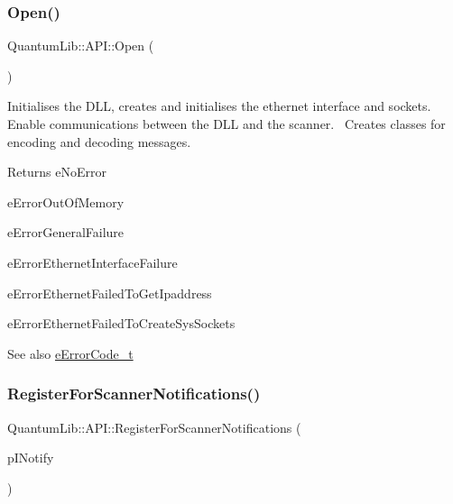 \subsubsection{\texorpdfstring{Open()}{Open()}}
{\footnotesize\ttfamily Quantum\+Lib\+::\+A\+P\+I\+::\+Open (\begin{DoxyParamCaption}{ }\end{DoxyParamCaption})\hspace{0.3cm}{\ttfamily [static]}}

Initialises the D\+LL, creates and initialises the ethernet interface and sockets.~\newline
Enable communications between the D\+LL and the scanner.~\newline
Creates classes for encoding and decoding messages.~\newline
\begin{DoxyReturn}{Returns}
e\+No\+Error 

e\+Error\+Out\+Of\+Memory 

e\+Error\+General\+Failure 

e\+Error\+Ethernet\+Interface\+Failure 

e\+Error\+Ethernet\+Failed\+To\+Get\+Ipaddress 

e\+Error\+Ethernet\+Failed\+To\+Create\+Sys\+Sockets 
\end{DoxyReturn}
\begin{DoxySeeAlso}{See also}
\mbox{\hyperlink{namespace_quantum_lib_ae3625bf7f9a1ca0d93adb9a2e0194d47}{e\+Error\+Code\+\_\+t}} 
\end{DoxySeeAlso}
\mbox{\label{class_quantum_lib_1_1_a_p_i_ad63c6415fc479338caecd97f05c06b02}} 
\subsubsection{\texorpdfstring{Register\+For\+Scanner\+Notifications()}{RegisterForScannerNotifications()}}
{\footnotesize\ttfamily Quantum\+Lib\+::\+A\+P\+I\+::\+Register\+For\+Scanner\+Notifications (\begin{DoxyParamCaption}\item[{\mbox{\hyperlink{class_quantum_lib_1_1_i_notify}{I\+Notify}} $\ast$}]{p\+I\+Notify }\end{DoxyParamCaption})\hspace{0.3cm}{\ttfamily [static]}}

